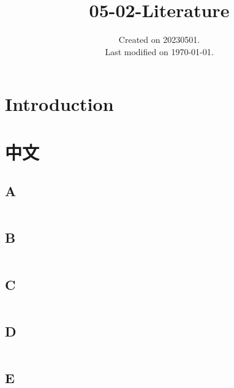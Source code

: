 \documentclass[UTF8]{../RepresentationUniverse}
\begin{document}
\title{05-02-Literature}
\date{Created on 20230501.\\   Last modified on \today.}
\maketitle
\tableofcontents


\chapter{Introduction}




\chapter{中文}


\section{A}
\begin{lstlisting}

\end{lstlisting}


\section{B}
\begin{lstlisting}

\end{lstlisting}


\section{C}
\begin{lstlisting}

\end{lstlisting}


\section{D}
\begin{lstlisting}

\end{lstlisting}


\section{E}
\begin{lstlisting}

\end{lstlisting}
\end{document}
